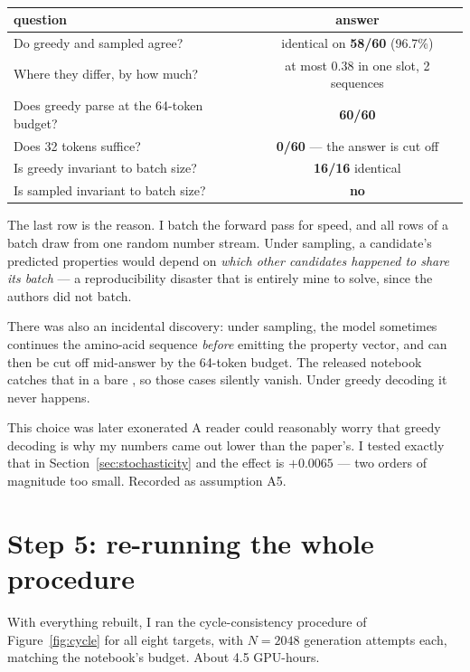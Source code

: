 \begin{table}[htbp]
\centering\small
\caption[Decoding diagnostics]{}
\begin{tabular}{lc}
\toprule
\textbf{question} & \textbf{answer} \\
\midrule
Do greedy and sampled agree? & identical on \textbf{58/60} (96.7\%) \\
Where they differ, by how much? & at most 0.38 in one slot, 2 sequences \\
Does greedy parse at the 64-token budget? & \textbf{60/60} \\
Does 32 tokens suffice? & \textbf{0/60} --- the answer is cut off \\
Is greedy invariant to batch size? & \textbf{16/16} identical \\
Is sampled invariant to batch size? & \textbf{no} \\
\bottomrule
\end{tabular}
\end{table}

The last row is the reason. I batch the forward pass for speed, and all rows of
a batch draw from one random number stream. Under sampling, a candidate's
predicted properties would depend on \emph{which other candidates happened to
share its batch} --- a reproducibility disaster that is entirely mine to solve,
since the authors did not batch.

There was also an incidental discovery: under sampling, the model sometimes
continues the amino-acid sequence \emph{before} emitting the property vector,
and can then be cut off mid-answer by the 64-token budget. The released
notebook catches that in a bare , so those cases silently vanish.
Under greedy decoding it never happens.

\begin{warnbox}{This choice was later exonerated}
A reader could reasonably worry that greedy decoding is why my numbers came out
lower than the paper's. I tested exactly that in
Section~\ref{sec:stochasticity} and the effect is $+0.0065$ --- two orders of
magnitude too small. Recorded as assumption A5.
\end{warnbox}

\section{Step 5: re-running the whole procedure}
\label{sec:table1}

With everything rebuilt, I ran the cycle-consistency procedure of
Figure~\ref{fig:cycle} for all eight targets, with $N = 2048$ generation
attempts each, matching the notebook's budget. About 4.5 GPU-hours.

